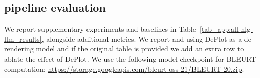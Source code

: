 \subsection{\pipeline{} pipeline evaluation}
\label{app:Evaluation_of_the_summary_repair_pipeline}
We report supplementary experiments and baselines in Table~\ref{tab_app:all-nlg-llm_results}, alongside additional metrics. We report \metric{} and \pipeline{} using DePlot as a de-rendering model and if the original table is provided we add an extra row to ablate the effect of DePlot.
We use the following model checkpoint for BLEURT computation: \url{https://storage.googleapis.com/bleurt-oss-21/BLEURT-20.zip}.
\label{app:all-nlg-llm_results}
\begin{table}
\centering
{}
\end{table}
